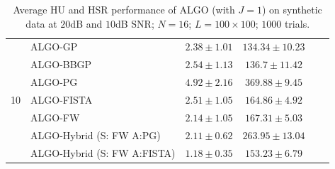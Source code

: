 \begin{table}[h]
\begin{adjustbox}{max width=\textwidth}
\begin{tabular}{|c|l|c|c|c|c|}
\multirow{7}{*}{10} & ALGO-GP                    & $2.38     \pm 1.01$   & $134.34   \pm 10.23$ \tabularnewline
                    & ALGO-BBGP                  & $2.54     \pm 1.13$   & $136.7    \pm 11.42$ \tabularnewline
                    & ALGO-PG                    & $4.92     \pm 2.16$   & $369.88   \pm 9.45$  \tabularnewline
                    & ALGO-FISTA                 & $2.51     \pm 1.05$   & $164.86   \pm 4.92$  \tabularnewline
                    & ALGO-FW                    & $2.14     \pm 1.05$   & $167.31   \pm 5.03$  \tabularnewline
                    & ALGO-Hybrid (S: FW A:PG)   & $2.11     \pm 0.62$   & $263.95   \pm 13.04$ \tabularnewline
                    & ALGO-Hybrid (S: FW A:FISTA)& $1.18     \pm 0.35$   & $153.23   \pm 6.79$  \tabularnewline \cline{1-4}
\end{tabular}
\end{adjustbox}
\caption{Average HU and HSR performance of ALGO (with $J=1$) on synthetic
         data at $20$dB and $10$dB SNR; $N = 16$; $L = 100 \times 100$; $1000$
         trials.}
\label{table:results_full_MO16_SNR2010dB_J1}
\end{table}

\newpage

